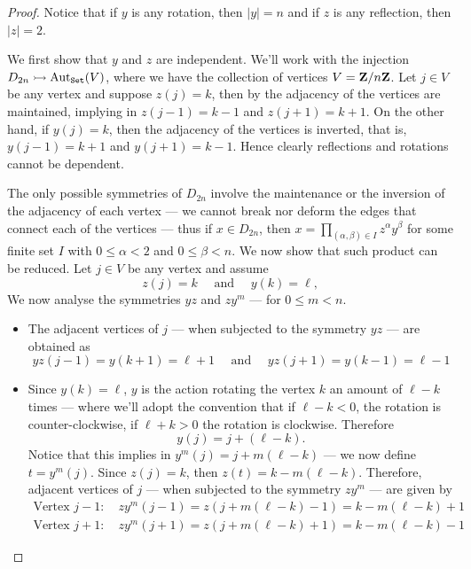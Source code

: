 \begin{proof}
Notice that if \(y\) is any rotation, then \(|y| = n\) and if \(z\) is any
reflection, then \(|z| = 2\).

We first show that \(y\) and \(z\) are independent. We'll work with the
injection \(D_{2n} \rightarrowtail \operatorname{Aut}_{\texttt{Set}}(V)\), where we have the collection of
vertices \(V = \mathbf{Z}/n\mathbf{Z}\). Let \(j \in V\) be any vertex and suppose \(z(j) =
k\), then by the adjacency of the vertices are maintained, implying in \(z(j -
1) = k - 1\) and \(z(j + 1) = k + 1\). On the other hand, if \(y(j) = k\),
then the adjacency of the vertices is inverted, that is, \(y(j - 1) = k + 1\)
and \(y(j + 1) = k - 1\). Hence clearly reflections and rotations cannot be
dependent.

The only possible symmetries of \(D_{2n}\) involve the maintenance or the
inversion of the adjacency of each vertex --- we cannot break nor deform the
edges that connect each of the vertices --- thus if \(x \in D_{2n}\), then
\(x = \prod_{(\alpha, \beta) \in I} z^\alpha y^\beta\) for some finite set
\(I\) with \(0 \leq \alpha < 2\) and \(0 \leq \beta < n\). We now show that such
product can be reduced. Let \(j \in V\) be any vertex and assume
\[
  z(j) = k
  \quad\text{ and }\quad
  y(k) = \ell,
\]
We now analyse the symmetries \(y z\) and \(z y^m\) --- for \(0 \leq m < n\).
\begin{itemize}
  \item The adjacent vertices of \(j\) --- when subjected to the symmetry \(y
    z\) --- are obtained as
    \[
      y z(j - 1) = y(k + 1) = \ell + 1
      \quad\text{ and }\quad
      y z(j + 1) = y(k - 1) = \ell - 1
    \]
  \item Since \(y(k) = \ell\), \(y\) is the action rotating the vertex \(k\)
    an amount of \(\ell - k\) times  --- where we'll adopt the convention that
    if \(\ell - k < 0\), the rotation is counter-clockwise, if \(\ell + k >
    0\) the rotation is clockwise. Therefore
    \[
      y(j) = j + (\ell - k).
    \]
    Notice that this implies in \(y^m(j) = j + m(\ell - k)\) --- we now define
    \(t = y^m(j)\). Since \(z(j) = k\), then \(z(t) = k - m(\ell - k)\).
    Therefore, adjacent vertices of \(j\) --- when subjected to the symmetry
    \(z y^m\) --- are given by
    \begin{gather*}
      \text{Vertex } j - 1: \quad
      z y^m(j - 1) = z(j + m (\ell - k) - 1) = k - m(\ell - k) + 1 \\
      \text{Vertex } j + 1: \quad
      z y^m(j + 1) = z(j + m (\ell - k) + 1) = k - m (\ell - k) - 1

\end{gather*}
\end{itemize}
\end{proof}

